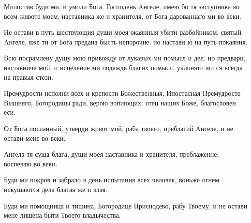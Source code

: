 \begin{mymulticols}



Милостив буди ми, и умоли Бога, Господень Aнгеле, имею бо тя заступника во всем животе моем, наставника же и хранителя, от Бога дарованнаго ми во веки.


Не остави в путь шествующия души моея окаянныя убити разбойником, святый Aнгеле, яже ти от Бога предана бысть непорочне; но настави ю на путь покаяния.

\slava

Всю посрамлену душу мою привожду от лукавых ми помысл и дел: но предвари, наставниче мой, и исцеление ми подаждь благих помысл, уклоняти ми ся всегда на правыя стези.

\inyne

Премудрости исполни всех и крепости Божественныя, Ипостасная Премудросте Вышняго, Богородицы ради, верою вопиющих: отец наших Боже, благословен еси.




От Бога посланный, утверди живот мой, раба твоего, преблагий Aнгеле, и не остави мене во веки.


Ангела тя суща блага, души моея наставника и хранителя, преблаженне, воспеваю во веки.

\slava

Буди ми покров и забрало в день испытания всех человек, воньже огнем искушаются дела благая же и злая.

\inyne

Буди ми помощница и тишина, Богородице Приснодево, рабу Твоему, и не остави мене лишена быти Твоего владычества.





\end{mymulticols}
